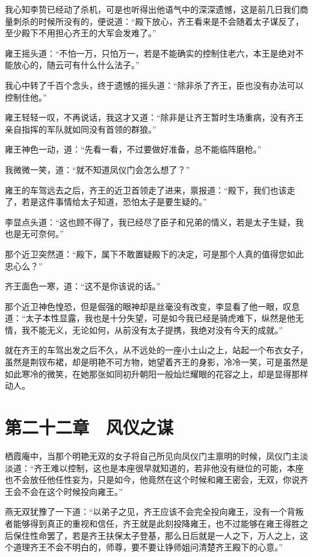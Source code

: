 我心知李贽已经动了杀机，可是也听得出他语气中的深深遗憾，这是前几日我们商量刺杀的时候所没有的，便说道：“殿下放心，齐王看来是不会随着太子谋反了，至少殿下不用担心齐王的大军会发难了。”

雍王摇头道：“不怕一万，只怕万一，若是不能确实的控制住老六，本王是绝对不能放心的，随云可有什么什么法子。”

我心中转了千百个念头，终于遗憾的摇头道：“除非杀了齐王，臣也没有办法可以控制住他。”

雍王轻轻一叹，不再说话，我这才又道：“除非是让齐王暂时生场重病，没有齐王亲自指挥的军队就如同没有首领的群狼。”

雍王神色一动，道：“先看一看，不过要做好准备，总不能临阵磨枪。”

我微微一笑，道：“就不知道凤仪门会怎么想了？”

雍王的车驾远去之后，齐王的近卫首领走了进来，禀报道：“殿下，我们也该走了，若是这件事情给太子知道，恐怕太子是要生疑的。”

李显点头道：“这也顾不得了，我已经尽了臣子和兄弟的情义，若是太子生疑，我也是无可奈何。”

那个近卫突然道：“殿下，属下不敢置疑殿下的决定，可是那个人真的值得您如此忠心么？”

齐王面色一寒，道：“这不是你该说的话。”

那个近卫神色惶恐，但是倔强的眼神却是丝毫没有改变，李显看了他一眼，叹息道：“太子本性显露，我也是十分失望，可是如今我已经是骑虎难下，纵然是他无情，我不能无义，无论如何，从前没有太子提携，我绝对没有今天的成就。”

就在齐王的车驾出发之后不久，从不远处的一座小土山之上，站起一个布衣女子，虽然是荆钗布裙，却是明艳不可方物，她望着齐王的身影，冷冷一笑，可是虽然是如此寒冷的微笑，在她那张如同初升朝阳一般灿烂耀眼的花容之上，却是显得那样动人。

\chapter{第二十二章　风仪之谋}

栖霞庵中，当那个明艳无双的女子将自己所见向凤仪门主禀明的时候，凤仪门主淡淡道：“齐王难以控制，这也是本座很早就知道的，若非他没有继位的可能，本座也不会放任他任性妄为，只是如今，他竟然在这个时候和雍王密会，无双，你说齐王会不会在这个时候投向雍王。”

燕无双犹豫了一下道：“以弟子之见，齐王应该不会完全投向雍王，没有一个背叛者能够得到真正的重视和信任，齐王就是此刻投降雍王，也不过能够在雍王得胜之后保住性命罢了，若是齐王扶保太子登基，那么日后就是一人之下，万人之上，这个道理齐王不会不明白的，师尊，要不要让铮师姐问清楚齐王殿下的心意。”


